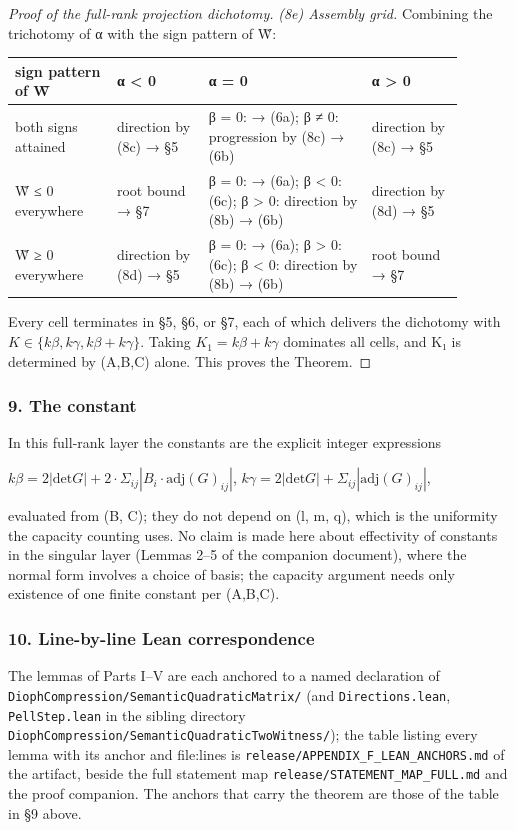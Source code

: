 \documentclass[11pt]{article}
\theoremstyle{plain}
\theoremstyle{definition}
\theoremstyle{remark}
\theoremstyle{plain}
\theoremstyle{definition}
\theoremstyle{remark}
\newcounter{Part}
\theoremstyle{plain}
\theoremstyle{definition}
\theoremstyle{remark}
\begin{document}
\begin{proof}[Proof of the full-rank projection dichotomy]
\emph{(8e) Assembly grid.} Combining the trichotomy of α with the sign pattern of W̃:

\begin{longtable}{@{}>{\raggedright\arraybackslash}p{0.201\linewidth}>{\raggedright\arraybackslash}p{0.182\linewidth}>{\raggedright\arraybackslash}p{0.329\linewidth}>{\raggedright\arraybackslash}p{0.182\linewidth}@{}}
\toprule
sign pattern of W̃ & α < 0 & α = 0 & α > 0 \\
\midrule\endhead
both signs attained & direction by (8c) → §5 & β = 0: → (6a); β ≠ 0: progression by (8c) → (6b) & direction by (8c) → §5 \\
W̃ ≤ 0 everywhere & root bound → §7 & β = 0: → (6a); β < 0: (6c); β > 0: direction by (8b) → (6b) & direction by (8d) → §5 \\
W̃ ≥ 0 everywhere & direction by (8d) → §5 & β = 0: → (6a); β > 0: (6c); β < 0: direction by (8b) → (6b) & root bound → §7 \\
\bottomrule
\end{longtable}
Every cell terminates in §5, §6, or §7, each of which delivers the dichotomy with $K ∈ \{kβ, kγ, kβ+kγ\}$. Taking $K_{1} = kβ + kγ$ dominates all cells, and K₁ is determined by (A,B,C) alone. This proves the Theorem.

\end{proof}
\subsubsection*{9. The constant}
In this full-rank layer the constants are the explicit integer expressions

$kβ = 2|\mathrm{det} G| + 2·Σ_{ij} |B_{i}·\mathrm{adj}(G)_{ij}|$,   $kγ = 2|\mathrm{det} G| + Σ_{ij} |\mathrm{adj}(G)_{ij}|$,

evaluated from (B, C); they do not depend on (l, m, q), which is the uniformity the capacity counting uses. No claim is made here about effectivity of constants in the singular layer (Lemmas 2–5 of the companion document), where the normal form involves a choice of basis; the capacity argument needs only existence of one finite constant per (A,B,C).

\subsubsection*{10. Line-by-line Lean correspondence}
The lemmas of Parts I--V are each anchored to a named declaration of \texttt{DiophCompression/SemanticQuadraticMatrix/} (and \texttt{Directions.\allowbreak{}lean}, \texttt{PellStep.\allowbreak{}lean} in the sibling directory \texttt{DiophCompression/SemanticQuadraticTwoWitness/}); the table listing every lemma with its anchor and file:lines is \texttt{release/APPENDIX\_\allowbreak{}F\_\allowbreak{}LEAN\_\allowbreak{}ANCHORS.\allowbreak{}md} of the artifact, beside the full statement map \texttt{release/STATEMENT\_\allowbreak{}MAP\_\allowbreak{}FULL.\allowbreak{}md} and the proof companion. The anchors that carry the theorem are those of the table in §9 above.
\end{document}
